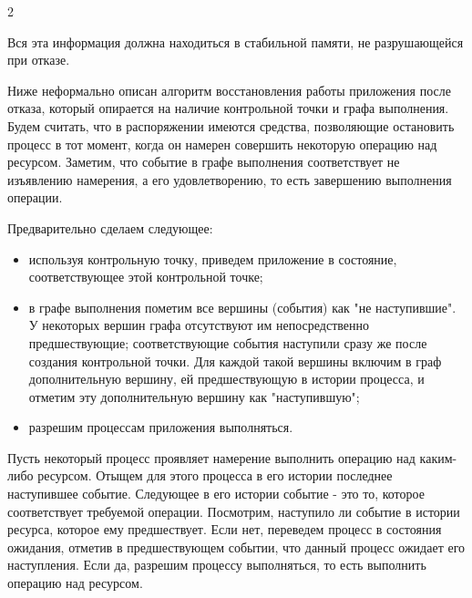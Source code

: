 \begin{multicols}{2}
\begin{figure}
\begin{center}
\end{center}

\vspace*{-9pt}


\vspace*{-3pt}

\end{figure}



Вся эта информация должна находиться в стабильной памяти, не разрушающейся при отказе.



Ниже неформально описан алгоритм восстановления работы приложения после отказа, который опирается на наличие контрольной точки и графа выполнения. Будем считать, что в распоряжении имеются средства, позволяющие остановить процесс в тот момент, когда он намерен совершить некоторую операцию над ресурсом. Заметим, что событие в графе выполнения соответствует не изъявлению намерения, а его удовлетворению, то есть завершению выполнения операции.



Предварительно сделаем следующее:

\begin{itemize}

\item используя контрольную точку, приведем приложение в состояние, соответствующее этой контрольной точке;

\item в графе выполнения пометим все вершины (события) как "не наступившие". У некоторых вершин графа отсутствуют им непосредственно предшествующие; соответствующие события наступили сразу же после создания контрольной точки. Для каждой такой вершины включим в граф дополнительную вершину, ей предшествующую в истории процесса, и отметим эту дополнительную вершину как "наступившую";

\item разрешим процессам приложения выполняться.

\end{itemize}



Пусть некоторый процесс проявляет намерение выполнить операцию над каким-либо ресурсом. Отыщем для этого процесса в его истории последнее наступившее событие. Следующее в его истории событие - это то, которое соответствует требуемой операции. Посмотрим, наступило ли событие в истории ресурса, которое ему предшествует. Если нет, переведем процесс в состояния ожидания, отметив в предшествующем событии, что данный процесс ожидает его наступления. Если да, разрешим процессу выполняться, то есть выполнить операцию над ресурсом.




\end{multicols}

